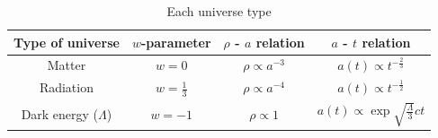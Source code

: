 \documentclass[12pt]{article}
\numberwithin{equation}{section}
\begin{document}
\begin{table}[H]
    \centering
    \begin{tabular}{|c|c|c|c|}\hline
        Type of universe & $w$-parameter & $\rho$ - $a$ relation & $a$ - $t$ relation \\ \hline
        Matter & $w = 0$ & $\rho \propto a^{-3}$ & $a(t) \propto \displaystyle t^{-\frac{2}{3}}$\\ \hline
        Radiation & $w = \displaystyle \frac{1}{3}$ & $\rho \propto a^{-4}$ & $a(t) \propto \displaystyle t^{-\frac{1}{2}}$\\ \hline
        Dark energy ($\Lambda$) & $w = -1$ & $\rho \propto 1 $ & $a(t) \propto \displaystyle \exp {\sqrt{\frac{\Lambda}{3}}ct}$\\ \hline
    \end{tabular}
    \caption{Each universe type}\label{table of universe type}
\end{table}
\end{document}
